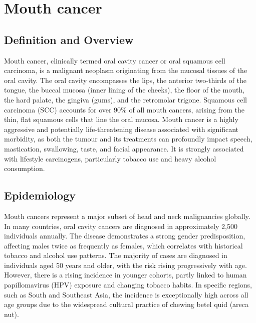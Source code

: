 \chapter{Mouth cancer}

\section*{Definition and Overview}
Mouth cancer, clinically termed oral cavity cancer or oral squamous cell carcinoma, is a malignant neoplasm originating from the mucosal tissues of the oral cavity. The oral cavity encompasses the lips, the anterior two-thirds of the tongue, the buccal mucosa (inner lining of the cheeks), the floor of the mouth, the hard palate, the gingiva (gums), and the retromolar trigone. Squamous cell carcinoma (SCC) accounts for over 90\% of all mouth cancers, arising from the thin, flat squamous cells that line the oral mucosa. Mouth cancer is a highly aggressive and potentially life-threatening disease associated with significant morbidity, as both the tumour and its treatments can profoundly impact speech, mastication, swallowing, taste, and facial appearance. It is strongly associated with lifestyle carcinogens, particularly tobacco use and heavy alcohol consumption.

\section*{Epidemiology}
Mouth cancers represent a major subset of head and neck malignancies globally. In many countries, oral cavity cancers are diagnosed in approximately 2,500 individuals annually. The disease demonstrates a strong gender predisposition, affecting males twice as frequently as females, which correlates with historical tobacco and alcohol use patterns. The majority of cases are diagnosed in individuals aged 50 years and older, with the risk rising progressively with age. However, there is a rising incidence in younger cohorts, partly linked to human papillomavirus (HPV) exposure and changing tobacco habits. In specific regions, such as South and Southeast Asia, the incidence is exceptionally high across all age groups due to the widespread cultural practice of chewing betel quid (areca nut).

